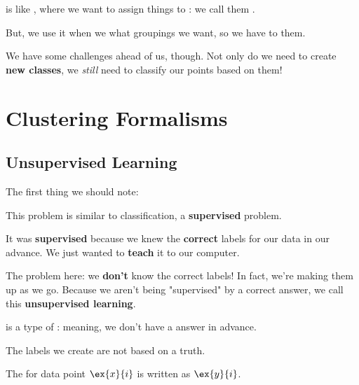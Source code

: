         \begin{concept}
             is like , where we want to assign things to : we call them .
            
            But, we use it when we  what groupings we want, so we have to  them.
        \end{concept}
        
        We have some challenges ahead of us, though. Not only do we need to create \textbf{new classes}, we \textit{still} need to classify our points based on them!


\section*{Clustering Formalisms}

    \subsection*{Unsupervised Learning}
        
        The first thing we should note: 
        
        This problem is similar to classification, a \textbf{supervised} problem.
        
        It was \textbf{supervised} because we knew the \textbf{correct} labels for our data in our advance. We just wanted to \textbf{teach} it to our computer.
        
        The problem here: we \textbf{don't} know the correct labels! In fact, we're making them up as we go. Because we aren't being "supervised" by a correct answer, we call this \textbf{unsupervised learning}.\\
        
        \begin{concept}
             is a type of : meaning, we don't have a  answer in advance.
            
            The labels we create are not based on a  truth.
            
            The  for data point $\ex{x}{i}$ is written as $\ex{y}{i}$.
        \end{concept}
        
